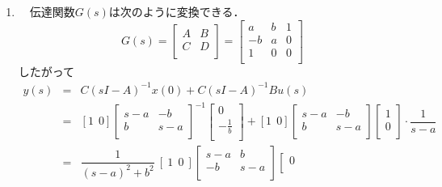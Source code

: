\documentclass[a4paper,11pt]{jarticle}
\begin{document}
\begin{enumerate}
 \item 
\ \ 伝達関数$ G(s) $は次のように変換できる．
\begin{equation*}
 G(s) = \left[
  \begin{array}{c|c}
   A & B \\ \hline
   C & D \\
  \end{array}
  \right] = \left[
  \begin{array}{cc|c}
   a & b & 1 \\
   -b & a & 0 \\ \hline
   1 & 0 & 0 \\
  \end{array}
  \right]
\end{equation*}
したがって
\begin{eqnarray*}
 y(s) & = & C (sI - A)^{-1} x(0) + C (sI - A)^{-1} B u(s)\\
      & = & [1 ~~ 0] \left[
		      \begin{array}{cc}
		       s-a & -b \\
		       b & s-a \\
		      \end{array}
		      \right]^{-1} \left[
		      \begin{array}{c}
		       0 \\
		       - \frac{1}{b} \\
		      \end{array}
				  \right] + [1 ~~ 0] \left[
				  \begin{array}{cc}
				   s-a & -b \\
				   b & s-a \\
				  \end{array}\right] \left[
				  \begin{array}{c}
				   1 \\
				   0 \\
				  \end{array}
						     \right] \cdot \dfrac{1}{s-a}\\
      & = & \dfrac{1}{(s-a)^2 + b^2}~ [~1 ~~ 0~] \left[
					      \begin{array}{cc}
					       s-a & b \\
					       -b & s-a \\
					      \end{array}
					      \right] \left[
						      \begin{array}{c}
						       0 \\

\end{array}
\end{eqnarray*}
\end{enumerate}
\end{document}
